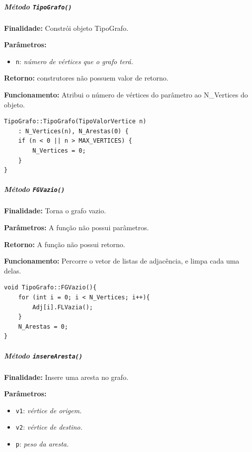 \documentclass{article}
\begin{document}
\subparagraph{Método \texttt{TipoGrafo()}}

    \mbox{}\par
    \noindent
    \textbf{Finalidade:} Constrói objeto TipoGrafo.

    \textbf{Parâmetros:}
    \begin{itemize}
       \item \texttt{n}: \textit{número de vértices que o grafo terá.}
    \end{itemize}

    \textbf{Retorno:} construtores não possuem valor de retorno.

    \textbf{Funcionamento:} Atribui o número de vértices do parâmetro ao N\_Vertices do objeto.

\begin{verbatim}
TipoGrafo::TipoGrafo(TipoValorVertice n)
    : N_Vertices(n), N_Arestas(0) {
    if (n < 0 || n > MAX_VERTICES) {
        N_Vertices = 0;
    }
}
\end{verbatim}











\subparagraph{Método \texttt{FGVazio()}}

    \mbox{}\par
    \noindent
    \textbf{Finalidade:} Torna o grafo vazio.

    \textbf{Parâmetros:} A função não possui parâmetros.

    \textbf{Retorno:} A função não possui retorno.

    \textbf{Funcionamento:} Percorre o vetor de listas de adjacência, e limpa cada uma delas.

\begin{verbatim}
void TipoGrafo::FGVazio(){
    for (int i = 0; i < N_Vertices; i++){
        Adj[i].FLVazia();
    }
    N_Arestas = 0;
}
\end{verbatim}


\subparagraph{Método \texttt{insereAresta()}}

    \mbox{}\par
    \noindent
    \textbf{Finalidade:} Insere uma aresta no grafo.

    \textbf{Parâmetros:}
    \begin{itemize}
        \item \texttt{v1}: \textit{vértice de origem.}
        \item \texttt{v2}: \textit{vértice de destino.}
        \item \texttt{p}: \textit{peso da aresta.}
    \end{itemize}
\end{document}
